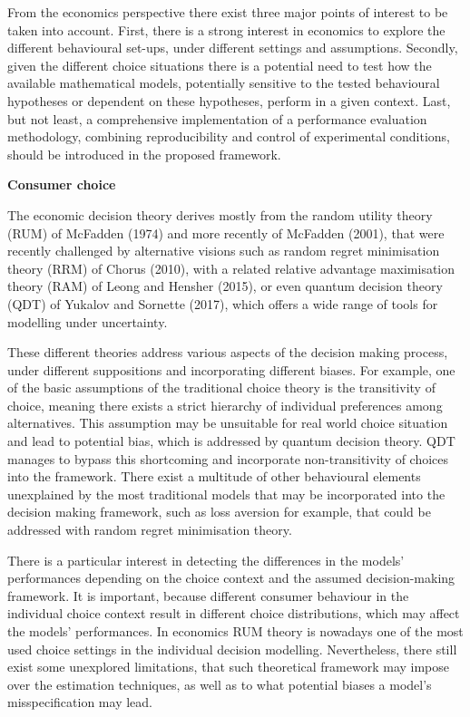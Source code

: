 \documentclass[12pt,]{article}
\begin{document}
From the economics perspective there exist three major points of
interest to be taken into account. First, there is a strong interest in
economics to explore the different behavioural set-ups, under different
settings and assumptions. Secondly, given the different choice
situations there is a potential need to test how the available
mathematical models, potentially sensitive to the tested behavioural
hypotheses or dependent on these hypotheses, perform in a given context.
Last, but not least, a comprehensive implementation of a performance
evaluation methodology, combining reproducibility and control of
experimental conditions, should be introduced in the proposed framework.

\textbf{Consumer choice}

The economic decision theory derives mostly from the random utility
theory (RUM) of McFadden (1974) and more recently of McFadden (2001),
that were recently challenged by alternative visions such as random
regret minimisation theory (RRM) of Chorus (2010), with a related
relative advantage maximisation theory (RAM) of Leong and Hensher
(2015), or even quantum decision theory (QDT) of Yukalov and Sornette
(2017), which offers a wide range of tools for modelling under
uncertainty.

These different theories address various aspects of the decision making
process, under different suppositions and incorporating different
biases. For example, one of the basic assumptions of the traditional
choice theory is the transitivity of choice, meaning there exists a
strict hierarchy of individual preferences among alternatives. This
assumption may be unsuitable for real world choice situation and lead to
potential bias, which is addressed by quantum decision theory. QDT
manages to bypass this shortcoming and incorporate non-transitivity of
choices into the framework. There exist a multitude of other behavioural
elements unexplained by the most traditional models that may be
incorporated into the decision making framework, such as loss aversion
for example, that could be addressed with random regret minimisation
theory.

There is a particular interest in detecting the differences in the
models' performances depending on the choice context and the assumed
decision-making framework. It is important, because different consumer
behaviour in the individual choice context result in different choice
distributions, which may affect the models' performances. In economics
RUM theory is nowadays one of the most used choice settings in the
individual decision modelling. Nevertheless, there still exist some
unexplored limitations, that such theoretical framework may impose over
the estimation techniques, as well as to what potential biases a model's
misspecification may lead.
\end{document}
